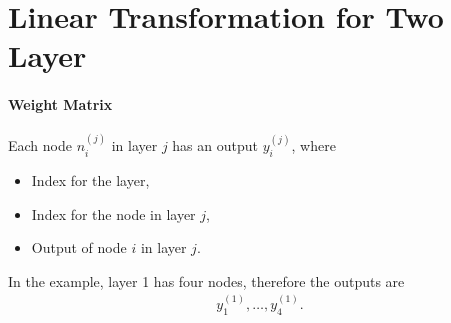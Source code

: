 \section{Linear Transformation for Two Layer} 
\paragraph{Weight Matrix}
Each node $n^{(j)}_i$ in layer $j$ has an output $y^{(j)}_i$, where 
\begin{itemize}
	\item[$j$] Index for the layer,
	\item[$i$] Index for the node in layer $j$,
	\item[$y$] Output of node $i$ in layer $j$.
\end{itemize}

In the example, layer 1 has four nodes, therefore the outputs are
\begin{align}
	y^{(1)}_1, \dots, y^{(1)}_4.
\end{align}

